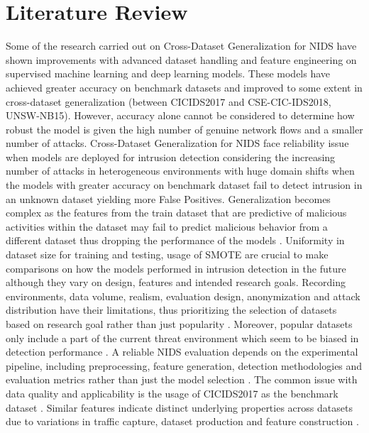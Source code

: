 \chapter{Literature Review}

Some of the research carried out on Cross-Dataset Generalization for NIDS have shown improvements with advanced dataset handling and feature engineering 
on supervised machine learning and deep learning models. These models have achieved greater accuracy on benchmark datasets and improved to some extent 
in cross-dataset generalization (between CICIDS2017 and CSE-CIC-IDS2018, UNSW-NB15). However, accuracy alone cannot be considered to determine how robust 
the model is given the high number of genuine network flows and a smaller number of attacks. Cross-Dataset Generalization for NIDS face reliability issue 
when models are deployed for intrusion detection considering the increasing number of attacks in heterogeneous environments with huge domain shifts when 
the models with greater accuracy on benchmark dataset fail to detect intrusion in an unknown dataset yielding more False Positives.  Generalization becomes 
complex as the features from the train dataset that are predictive of malicious activities within the dataset may fail to predict malicious behavior from a 
different dataset thus dropping the performance of the models \cite{Elangovan2026}. Uniformity in dataset size for training and testing, usage of SMOTE 
are crucial to make comparisons on how the models performed in intrusion detection in the future although they vary on design, features and intended research
goals. Recording environments, data volume, realism, evaluation design, anonymization and attack distribution have their limitations, thus prioritizing the selection
of datasets based on research goal rather than just popularity \cite{Ring2019,Thakkar2020,Kenyon2020}. Moreover, popular datasets only include a part of the current 
threat environment which seem to be biased in detection performance \cite{Hindy2020}. A reliable NIDS evaluation depends on the experimental pipeline, including preprocessing, 
feature generation, detection methodologies and evaluation metrics rather than just the model selection \cite{Yang2022}. The common issue with data quality and applicability 
is the usage of CICIDS2017 as the benchmark dataset \cite{Goldschmidt2025}. Similar features indicate distinct underlying properties across datasets due to variations in traffic 
capture, dataset production and feature construction \cite{Pinto2025}. 

